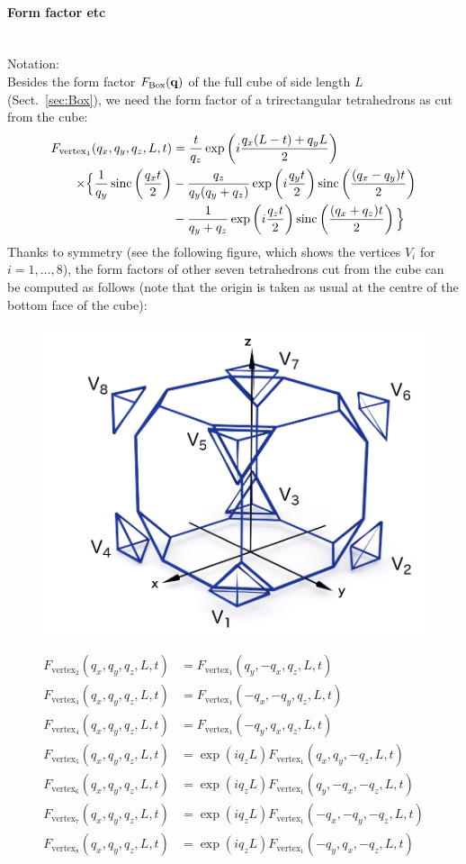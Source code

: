\paragraph{Form factor etc}\strut\\
Notation:\\
Besides the form factor $F_\text{Box}(\mathbf{q})$
of the full cube of side length $L$ (Sect.~\ref{sec:Box}),
we need the form factor of a trirectangular tetrahedrons
as cut from the cube:
\begin{align*}
F_{\text{vertex}_1}(q_x, q_y, q_z, L, t) &=\frac{t}{q_z}\exp\left( i\frac{q_x(L-t)+ q_y L}{2} \right) \\
\times \Big\{ \frac{1}{q_y} \operatorname{sinc}\left( \frac{q_x t}{2}\right)
&- \frac{q_z}{q_y(q_y + q_z)} \exp\left(i\frac{q_yt}{2}\right) \operatorname{sinc}\left( \frac{(q_x-q_y)t}{2}\right)\\
&- \frac{1}{q_y + q_z} \exp\left( i\frac{q_z t}{2} \right) \operatorname{sinc} \left( \frac{(q_x+q_z) t}{2} \right)  \Big\}    
\end{align*}
Thanks to symmetry (see the following figure,
which shows the vertices $V_i$ for $i=1,\ldots,8$),
the form factors of other seven tetrahedrons cut from the cube
can be computed as follows
(note that the origin is taken as usual
at the centre of the bottom face of the cube):
\begin{figure}[H]
\begin{center}
\includegraphics[width=.5\textwidth]{fig/drawing/SketchTruncatedcube.png}
\end{center}
\end{figure}
\begin{align*}
F_{\text{vertex}_2}(q_x, q_y, q_z, L, t) &= F_{\text{vertex}_1}(q_y, -q_x, q_z, L, t) \\
F_{\text{vertex}_3}(q_x, q_y, q_z, L, t) &= F_{\text{vertex}_1}(-q_x, -q_y, q_z, L, t) \\
F_{\text{vertex}_4}(q_x, q_y, q_z, L, t) &= F_{\text{vertex}_1}(-q_y, q_x, q_z, L, t) \\
F_{\text{vertex}_5}(q_x, q_y, q_z, L, t) &= \exp(iq_zL)F_{\text{vertex}_1}(q_x, q_y, -q_z, L, t) \\
F_{\text{vertex}_6}(q_x, q_y, q_z, L, t) &= \exp(iq_zL)F_{\text{vertex}_1}(q_y, -q_x,- q_z, L, t) \\
F_{\text{vertex}_7}(q_x, q_y, q_z, L, t) &= \exp(iq_zL)F_{\text{vertex}_1}(-q_x, -q_y, -q_z, L, t) \\
F_{\text{vertex}_8}(q_x, q_y, q_z, L, t) &= \exp(iq_zL)F_{\text{vertex}_1}(-q_y, q_x, -q_z, L, t)
\end{align*}

